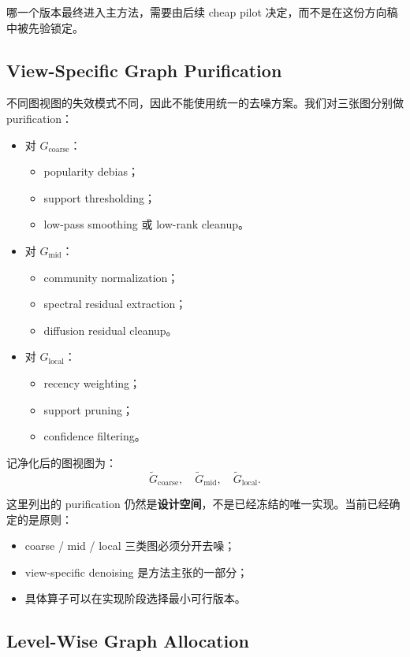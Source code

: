 \documentclass[11pt]{article}
\begin{document}
哪一个版本最终进入主方法，需要由后续 cheap pilot 决定，而不是在这份方向稿中被先验锁定。

\subsection{View-Specific Graph Purification}

不同图视图的失效模式不同，因此不能使用统一的去噪方案。我们对三张图分别做 purification：
\begin{itemize}
  \item 对 $G_{\text{coarse}}$：
  \begin{itemize}
    \item popularity debias；
    \item support thresholding；
    \item low-pass smoothing 或 low-rank cleanup。
  \end{itemize}
  \item 对 $G_{\text{mid}}$：
  \begin{itemize}
    \item community normalization；
    \item spectral residual extraction；
    \item diffusion residual cleanup。
  \end{itemize}
  \item 对 $G_{\text{local}}$：
  \begin{itemize}
    \item recency weighting；
    \item support pruning；
    \item confidence filtering。
  \end{itemize}
\end{itemize}

记净化后的图视图为：
\[
\tilde{G}_{\text{coarse}},\quad
\tilde{G}_{\text{mid}},\quad
\tilde{G}_{\text{local}}.
\]

这里列出的 purification 仍然是\textbf{设计空间}，不是已经冻结的唯一实现。当前已经确定的是原则：
\begin{itemize}
  \item coarse / mid / local 三类图必须分开去噪；
  \item view-specific denoising 是方法主张的一部分；
  \item 具体算子可以在实现阶段选择最小可行版本。
\end{itemize}

\subsection{Level-Wise Graph Allocation}
\end{document}
